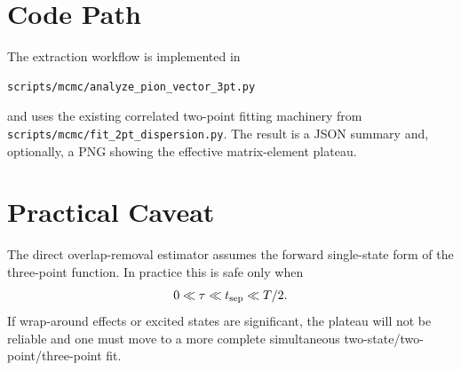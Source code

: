 \documentclass[11pt]{article}
\begin{document}
\section{Code Path}
The extraction workflow is implemented in
\begin{verbatim}
scripts/mcmc/analyze_pion_vector_3pt.py
\end{verbatim}
and uses the existing correlated two-point fitting machinery from
\texttt{scripts/mcmc/fit\_2pt\_dispersion.py}. The result is a JSON summary and,
optionally, a PNG showing the effective matrix-element plateau.

\section{Practical Caveat}
The direct overlap-removal estimator assumes the forward single-state form of
the three-point function. In practice this is safe only when
\begin{equation}
  0 \ll \tau \ll t_{\rm sep} \ll T/2.
\end{equation}
If wrap-around effects or excited states are significant, the plateau will not
be reliable and one must move to a more complete simultaneous
two-state/two-point/three-point fit.
\end{document}
